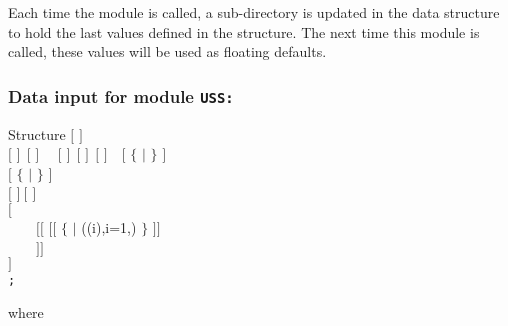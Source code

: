 Each time the  module is called, a sub-directory is updated in the
 data structure to hold the last values defined in the
 structure. The next time this module is called,
these values will be used as floating defaults.

\subsubsection{Data input for module {\tt USS:}}\label{sect:descuss}

\begin{DataStructure}{Structure }
$[$   $]$ \\
$[$    $]~~[$    $]$~~
$[$   $]~~[$  $]~~[$  $]$~~$[$ $\{$  $|$
 $\}$ $]$ \\ 
$[$ $\{$  $|$  $\}$ $]$ \\
$[$   $]~[$  $]$ \\
$[$  \\
~~~~$[[$   $[[$  $\{$  $|$
((i),i=1,) $\}$ $]]$ \\
~~~~$]]$ \\
 $]$ \\
{\tt ;}
\end{DataStructure}

\noindent where

